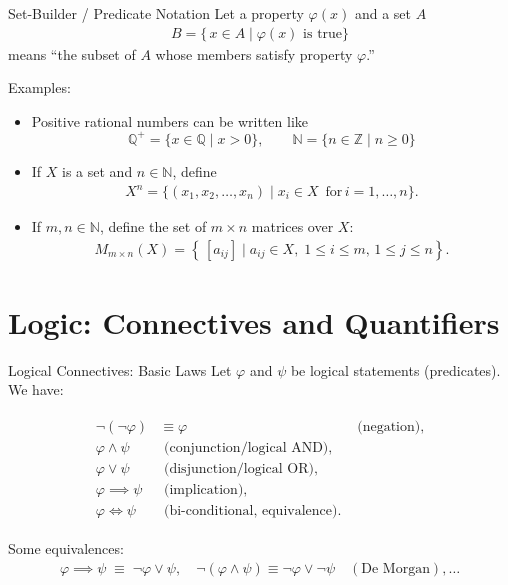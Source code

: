 \begin{frame}{Set-Builder / Predicate Notation}
Let a property $\varphi(x)$ and a set $A$
\begin{align*}
  B = \{\, x \in A \mid \varphi(x) \text{ is true} \}
\end{align*}
means “the subset of \(A\) whose members satisfy property \(\varphi\).”


\begin{block}{Examples:}
\vspace{-0.2cm}

\begin{itemize}
    \item Positive rational numbers can be written like
    $$\mathbb{Q}^{+} = \{ x \in \mathbb{Q} \mid x > 0\}, \qquad
  \mathbb{N} = \{ n \in \mathbb{Z} \mid n \ge 0 \}$$
\item If \(X\) is a set and \(n \in \mathbb{N}\), define
\begin{align*}
  X^n = \{ (x_1, x_2, \dots, x_n) \mid x_i \in X \, \, \,\text{for}\, i = 1,\dots,n\}.
\end{align*}
\item If \(m,n \in \mathbb{N}\), define the set of \(m\times n\) matrices over \(X\):
\begin{align*}
  M_{m \times n}(X) = \left\{\, [a_{ij}] \mid a_{ij} \in X,\; 1 \le i \le m,\,1 \le j \le n\right\}.
\end{align*}
\end{itemize}

\end{block}
\end{frame}

\section{Logic: Connectives and Quantifiers}

\begin{frame}{Logical Connectives: Basic Laws}
Let \(\varphi\) and \(\psi\) be logical statements (predicates). We have:
\begin{block}{}
\hspace{-2cm}
\begin{align*}
\begin{aligned}
\neg (\neg \varphi) &\equiv \varphi &\text{ (negation)}, \\
\varphi \land \psi &\text{ (conjunction/logical AND)}, \\
\varphi \lor \psi &\text{ (disjunction/logical OR)}, \\
\varphi \implies \psi &\text{ (implication)}, \\
\varphi \iff \psi &\text{ (bi-conditional, equivalence)}.
\end{aligned}
\end{align*}
\end{block}

Some equivalences:
\begin{align*}
\varphi \implies \psi \;\equiv\; \neg \varphi \lor \psi, \quad
\neg(\varphi \land \psi) \equiv \neg \varphi \lor \neg \psi \quad (\text{De Morgan}), \dots
\end{align*}
\end{frame}

